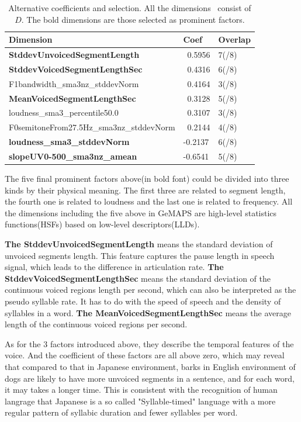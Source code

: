 \begin{table}[th]
	\centering
	\scriptsize
	\begin{tabular}{l|ll}
		\toprule
		    Dimension & Coef  & Overlap    \\
		\midrule
	    \textbf{StddevUnvoicedSegmentLength} & \ 0.5956  & 7(/8)   \\
		\textbf{StddevVoicedSegmentLengthSec} & \ 0.4316   & 6(/8)\\
		F1bandwidth\_sma3nz\_stddevNorm & \ 0.4164 & 3(/8)  \\
		\textbf{MeanVoicedSegmentLengthSec} & \ 0.3128 & 5(/8)\\
		loudness\_sma3\_percentile50.0 &\ 0.3107 & 3(/8)\\
		F0semitoneFrom27.5Hz\_sma3nz\_stddevNorm & \ 0.2144 & 4(/8)\\
		\textbf{loudness\_sma3\_stddevNorm} & -0.2137 & 6(/8)\\
		\textbf{slopeUV0-500\_sma3nz\_amean} & -0.6541 & 5(/8)\\
		\bottomrule
	\end{tabular}
	\caption{Alternative coefficients and selection. All the dimensions~\cite{eyben2015geneva} consist of $D$. The bold dimensions are those selected as prominent factors.}
	\label{table:prominentfactor}
\end{table}

The five final prominent factors above(in bold font)  could be divided into three kinds by their physical meaning. The first three are related to segment length, the fourth one is related to loudness and the last one is related to frequency. All the dimensions including the five above in GeMAPS are high-level statistics functions(HSFs) based on low-level descriptors(LLDs).


\textbf{The StddevUnvoicedSegmentLength} means the standard deviation of unvoiced segments length. This feature captures the pause length in speech signal, which leads to the difference in articulation rate. \textbf{The StddevVoicedSegmentLengthSec} means the standard deviation of the continuous voiced regions length per second, which can also be interpreted as the pseudo syllable rate. It has to do with the speed of speech and the density of syllables in a word. \textbf{The MeanVoicedSegmentLengthSec} means the average length of the continuous voiced regions per second.

As for the 3 factors introduced above, they describe the temporal features of the voice. And the coefficient of these factors are all above zero, which may reveal that compared to that in Japanese environment, barks in English environment of dogs are likely to have more unvoiced segments in a sentence, and for each word, it may takes a longer time. This is consistent with the recognition of human langrage that Japanese is a so called "Syllable-timed" language with a more regular pattern of syllabic duration and fewer syllables per word\cite{arai1997temporal, greenberg1997origins}.

